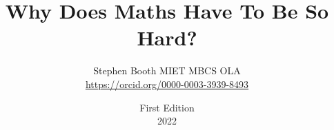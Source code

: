 \title{Why Does Maths Have To Be So Hard?}

\author{Stephen Booth MIET MBCS OLA \\ \url{https://orcid.org/0000-0003-3939-8493}}
\date{First Edition \\2022}
